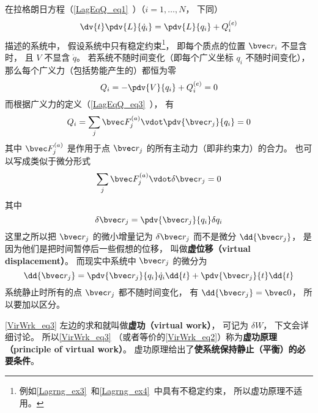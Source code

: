 
\begin{issues}
\issueTODO
\end{issues}


在拉格朗日方程（\autoref{LagEqQ_eq1}~）（$i=1,\dots,N$， 下同）
\begin{equation}\label{VirWrk_eq1}
\dv{t} \pdv{L}{\dot q_i} = \pdv{L}{q_i} + Q_i^{(e)}
\end{equation}
描述的系统中， 假设系统中只有稳定约束\footnote{例如\autoref{Lagrng_ex3}~和\autoref{Lagrng_ex4}~中具有不稳定约束， 所以虚功原理不适用。}， 即每个质点的位置 $\bvec r_i$ 不显含时， 且 $V$ 不显含 $\dot q$。 若系统不随时间变化（即每个广义坐标 $q_i$ 不随时间变化）， 那么每个广义力（包括势能产生的）都恒为零
\begin{equation}\label{VirWrk_eq2}
Q_i = -\pdv{V}{q_i} + Q_i^{(e)} = 0
\end{equation}
而根据广义力的定义（\autoref{LagEqQ_eq3}~）， 有
\begin{equation}
Q_i = \sum_j \bvec F_j^{(a)} \vdot \pdv{\bvec r_j}{q_i} = 0
\end{equation}
其中 $\bvec F_j^{(a)}$ 是作用于点 $\bvec r_j$ 的所有主动力（即非约束力）的合力。 也可以写成类似于微分形式
\begin{equation}\label{VirWrk_eq3}
\sum_j \bvec F_j^{(a)} \vdot \delta \bvec r_j = 0
\end{equation}
其中
\begin{equation}
\delta \bvec r_j = \pdv{\bvec r_j}{q_i}\delta{q_i}
\end{equation}
这里之所以把 $\bvec r_j$ 的微小增量记为 $\delta \bvec r_j$ 而不是微分 $\dd{\bvec r_j}$， 是因为他们是把时间暂停后一些假想的位移， 叫做\textbf{虚位移（virtual displacement）}。 而现实中系统中 $\bvec r_j$ 的微分为
\begin{equation}
\dd{\bvec r_j} = \pdv{\bvec r_j}{q_i}\dot{q}_i\dd{t} + \pdv{\bvec r_j}{t}\dd{t}
\end{equation}
系统静止时所有的点 $\bvec r_j$ 都不随时间变化， 有 $\dd{\bvec r_j} = \bvec 0$， 所以要加以区分。

\autoref{VirWrk_eq3} 左边的求和就叫做\textbf{虚功（virtual work）}， 可记为 $\delta W$， 下文会详细讨论。 所以\autoref{VirWrk_eq3} （或者等价的\autoref{VirWrk_eq2}）称为\textbf{虚功原理（principle of virtual work）}。 虚功原理给出了\textbf{使系统保持静止（平衡）的必要条件}。


